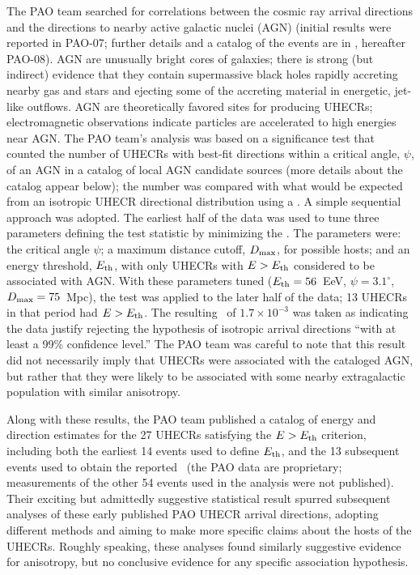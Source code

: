 The PAO team searched for correlations between the cosmic ray arrival
directions and the directions to nearby active galactic nuclei (AGN)
(initial results were reported in PAO-07; further details and a catalog of
the events are in \cite{PAO08-AGN}, hereafter PAO-08). AGN are unusually
bright cores of galaxies; there is strong (but indirect) evidence that they
contain supermassive black holes rapidly accreting nearby gas and stars and
ejecting some of the accreting material in energetic, jet-like outflows. 
AGN are theoretically favored sites for producing UHECRs; electromagnetic
observations indicate particles are accelerated to high energies near AGN. 
The PAO team's analysis was based on a significance test that counted the
number of UHECRs with best-fit directions within a critical angle, $\psi$,
of an AGN in a catalog of local AGN candidate sources (more details about
the catalog appear below); the number was compared with what would be
expected from an isotropic UHECR directional distribution using a \pval.
A simple sequential approach was adopted.  The earliest half of the data was
used to tune three parameters defining the test statistic by minimizing the
\pval.  The parameters were: the critical angle $\psi$; a maximum distance
cutoff, $D_{\rm max}$, for possible hosts; and an energy threshold, $E_{\rm th}$, with
only UHECRs with $E>E_{\rm th}$ considered to be associated with AGN. With these
parameters tuned ($E_{\rm th}=56$~EeV, $\psi=3.1^\circ$, $D_{\rm max}=75$~Mpc), the test
was applied to the later half of the data; 13 UHECRs in that period had
$E>E_{\rm th}$.  The resulting \pval\ of $1.7\times 10^{-3}$ was taken as
indicating the data justify rejecting the hypothesis of isotropic arrival
directions ``with at least a 99\% confidence level.'' The PAO team was
careful to note that this result did not necessarily imply that UHECRs were
associated with the cataloged AGN, but rather that they were likely to be
associated with some nearby extragalactic population with similar
anisotropy.

Along with these results, the PAO team published a catalog of energy and
direction estimates for the 27 UHECRs satisfying the $E>E_{\rm th}$ criterion,
including both the earliest 14 events used to define $E_{\rm th}$, and the 13
subsequent events used to obtain the reported \pval\ (the PAO data are
proprietary; measurements of the other 54 events used in the analysis were
not published).  Their exciting but admittedly suggestive statistical result
spurred subsequent analyses of these early published PAO UHECR
arrival directions, adopting different methods and aiming to make more
specific claims about the hosts of the UHECRs.  Roughly speaking, these
analyses found similarly suggestive evidence for anisotropy, but no
conclusive evidence for any specific association hypothesis.

